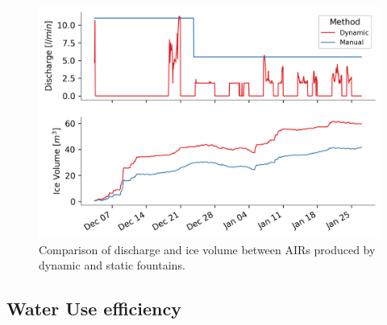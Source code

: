 \documentclass[utf8]{frontiersSCNS}
\begin{document}
\begin{figure}[ht]
	\begin{center}
		\includegraphics[width=\linewidth]{Figures/autovsman_dis.png}
	\end{center}
	\caption{Comparison of discharge and ice volume between AIRs produced by dynamic and static fountains. }
	\label{fig:old_icestupa}
\end{figure}






\subsection{Water Use efficiency}
\end{document}
